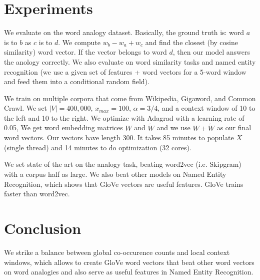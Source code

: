\documentclass[a4paper]{article}
\begin{document}
\section{Experiments}
We evaluate on the word analogy dataset. Basically, the ground truth is:
word $a$ is to $b$ as $c$ is to $d$. We compute $w_{b} - w_{a} + w_{c}$ and
find the closest (by cosine similarity) word vector. If the vector belongs to
word $d$, then our model answers the anology correctly. We also evaluate on
word similarity tasks and named entity recognition (we use a given set of
features + word vectors for a 5-word window and feed them into a conditional
random field).

We train on multiple corpora that come from Wikipedia, Gigaword, and Common
Crawl. We set $|V| = 400,000$, $x_{max} = 100$, $\alpha = 3/4$, and a context
window of 10 to the left and 10 to the right. We optimize with Adagrad with
a learning rate of 0.05, We get word embedding matrices $W$ and $\tilde{W}$
and we use $W + \tilde{W}$ as our final word vectors. Our vectors have length
300. It takes 85 minutes to populate $X$ (single thread) and 14 minutes to
do optimization (32 cores).

We set state of the art on the analogy task, beating word2vec (i.e. Skipgram)
with a corpus half as large. We also beat other models on Named Entity
Recognition, which shows that GloVe vectors are useful features. GloVe trains
faster than word2vec.

\section{Conclusion}
We strike a balance between global co-occurence counts and local context
windows, which allows to create GloVe word vectors that beat other word
vectors on word analogies and also serve as useful features in Named Entity
Recognition.
\end{document}
